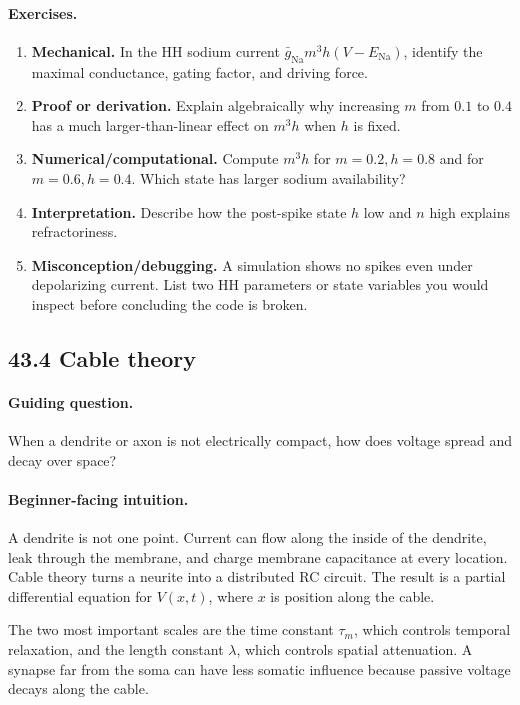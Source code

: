 \paragraph{Exercises.}
\begin{enumerate}[label=\textbf{43.3.\arabic*.}, leftmargin=*]
\item \textbf{Mechanical.} In the HH sodium current \(\bar g_{\mathrm{Na}}m^3h(V-E_{\mathrm{Na}})\), identify the maximal conductance, gating factor, and driving force.
\item \textbf{Proof or derivation.} Explain algebraically why increasing \(m\) from \(0.1\) to \(0.4\) has a much larger-than-linear effect on \(m^3h\) when \(h\) is fixed.
\item \textbf{Numerical/computational.} Compute \(m^3h\) for \(m=0.2,h=0.8\) and for \(m=0.6,h=0.4\). Which state has larger sodium availability?
\item \textbf{Interpretation.} Describe how the post-spike state \(h\) low and \(n\) high explains refractoriness.
\item \textbf{Misconception/debugging.} A simulation shows no spikes even under depolarizing current. List two HH parameters or state variables you would inspect before concluding the code is broken.
\end{enumerate}

\subsection{43.4 Cable theory}

\paragraph{Guiding question.}
When a dendrite or axon is not electrically compact, how does voltage spread and decay over space?

\paragraph{Beginner-facing intuition.}
A dendrite is not one point. Current can flow along the inside of the dendrite, leak through the membrane, and charge membrane capacitance at every location. Cable theory turns a neurite into a distributed RC circuit. The result is a partial differential equation for \(V(x,t)\), where \(x\) is position along the cable.

The two most important scales are the time constant \(\tau_m\), which controls temporal relaxation, and the length constant \(\lambda\), which controls spatial attenuation. A synapse far from the soma can have less somatic influence because passive voltage decays along the cable.

